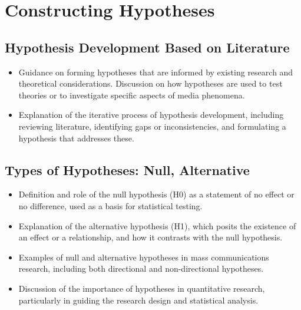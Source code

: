 \documentclass[
]{book}
\begin{document}
\hypertarget{constructing-hypotheses}{%
\section*{Constructing Hypotheses}\label{constructing-hypotheses}}

\hypertarget{hypothesis-development-based-on-literature}{%
\subsection*{Hypothesis Development Based on Literature}\label{hypothesis-development-based-on-literature}}

\begin{itemize}
\item
  Guidance on forming hypotheses that are informed by existing research and theoretical considerations. Discussion on how hypotheses are used to test theories or to investigate specific aspects of media phenomena.
\item
  Explanation of the iterative process of hypothesis development, including reviewing literature, identifying gaps or inconsistencies, and formulating a hypothesis that addresses these.
\end{itemize}

\hypertarget{types-of-hypotheses-null-alternative}{%
\subsection*{Types of Hypotheses: Null, Alternative}\label{types-of-hypotheses-null-alternative}}

\begin{itemize}
\item
  Definition and role of the null hypothesis (H0) as a statement of no effect or no difference, used as a basis for statistical testing.
\item
  Explanation of the alternative hypothesis (H1), which posits the existence of an effect or a relationship, and how it contrasts with the null hypothesis.
\item
  Examples of null and alternative hypotheses in mass communications research, including both directional and non-directional hypotheses.
\item
  Discussion of the importance of hypotheses in quantitative research, particularly in guiding the research design and statistical analysis.
\end{itemize}
\end{document}

